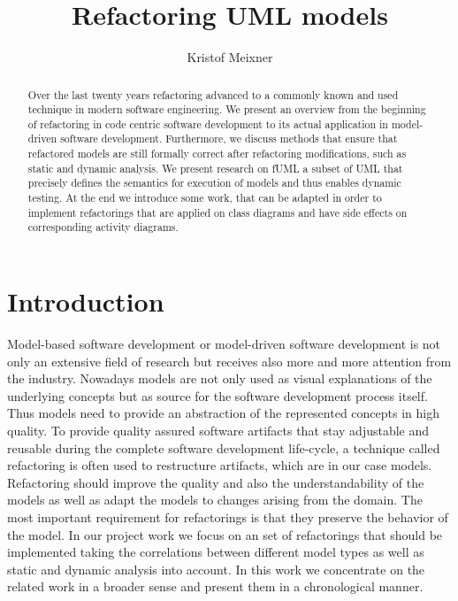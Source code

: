\documentclass{llncs}
\begin{document}
\renewcommand{\thelstlisting}{\arabic{lstlisting}}
\pagestyle{plain}

\title{Refactoring UML models}
\author{Kristof Meixner}

\maketitle

\begin{abstract} Over the last twenty years refactoring advanced to a commonly known and used technique in modern
software engineering. We present an overview from the beginning of refactoring in code centric software development to its actual application
in model-driven software development. Furthermore, we discuss methods that ensure that refactored models are still formally 
correct after refactoring modifications, such as static and dynamic analysis. We present research on fUML a subset of UML that precisely defines the semantics 
for execution of models and thus enables dynamic testing. At the end we introduce some work, that can be adapted in order to
implement refactorings that are applied on class diagrams and have side effects on corresponding activity diagrams.
\end{abstract}


\tableofcontents
\newpage


\section{Introduction}
\label{sec:intro}

Model-based software development or model-driven software development is not only an extensive field of research but
receives also more and more attention from the industry. Nowadays models are not only used as visual explanations of
the underlying concepts but as source for the software development process itself. Thus models need to provide an abstraction of the
represented concepts in high quality. To provide quality assured software artifacts that stay adjustable and reusable during the complete software development
life-cycle, a technique called refactoring is often used to restructure artifacts, which are in our case models. Refactoring should improve
the quality and also the understandability of the models as well as adapt the models to changes arising from the
domain. The most important requirement for refactorings is that they preserve the behavior of the model. In our project
work we focus on an set of refactorings that should be implemented taking the correlations between different model types
as well as static and dynamic analysis into account. In this work we concentrate on the related work in a broader sense
and present them in a chronological manner.
\end{document}
